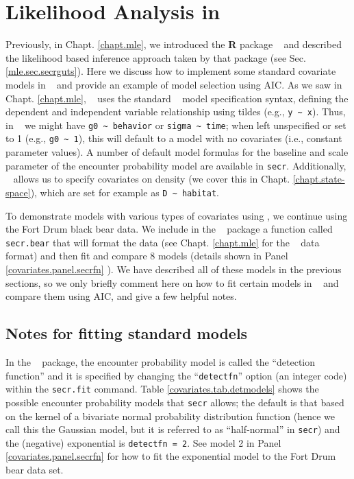 \section{Likelihood Analysis in \secr}
\label{likelihood.secr}

Previously, in Chapt. \ref{chapt.mle}, we introduced the {\bf R}
package \secr~ and described the likelihood based inference approach taken
by that package (see Sec. \ref{mle.sec.secrguts}).  Here we discuss how
to implement some standard covariate models in \secr~ and provide an
example of model selection using AIC.   As we saw in
Chapt. \ref{chapt.mle}, \secr~ uses the standard \R~ model
specification syntax, defining the dependent and independent
variable relationship using tildes (e.g., \verb+y ~ x+).  Thus, in
\secr~ we might have \verb+g0 ~ behavior+ or
\verb+sigma ~ time+; when left unspecified or set to 1 (e.g.,
\verb+g0 ~ 1+), this will default to a model with no covariates (i.e.,
constant parameter values).  A number of default model formulas for
the baseline and scale parameter of the encounter probability model
are available in \mbox{\tt secr}.
Additionally, \secr~ allows us to specify
covariates on density (we cover this in
Chapt. \ref{chapt.state-space}), which are set for
example as \verb+D ~ habitat+.

To demonstrate
 models with various types of covariates using \secr, we
continue using the Fort Drum black bear data. 
We include in the \scrbook~ package a function called {\tt secr.bear}
that will format the data (see Chapt. \ref{chapt.mle} for the \secr~
data format) and then fit and compare 8 models (details shown in Panel
\ref{covariates.panel.secrfn} ).  We have described all of these
models in the previous sections, so we only briefly comment here on
how to fit certain models in \secr~ and compare them using AIC, and
give a few helpful notes.

\subsection{Notes for fitting standard models}

In the \secr~ package, the encounter probability model is called the
``detection function'' and it is specified 
by changing the ``\mbox{\tt detectfn}'' option (an integer code)
within the \mbox{\tt secr.fit} command.  Table
\ref{covariates.tab.detmodels} shows the possible encounter
probability models 
that \mbox{\tt secr} allows; the default is that based on the kernel
of a bivariate normal probability distribution function
(hence we call this the Gaussian model, but it is referred to as
``half-normal'' 
in \mbox{\tt secr}) and the
(negative) exponential is \mbox{\tt detectfn = 2}.  See model 2 in 
Panel \ref{covariates.panel.secrfn} for how to fit the exponential 
model to the Fort Drum bear data set. 

